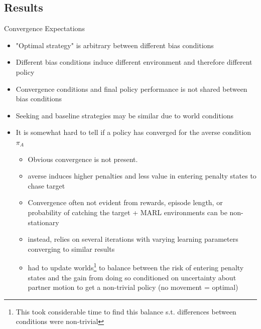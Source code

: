 \documentclass[aspectratio=1610, xcolor=dvipsnames]{packages/beamer}
\begin{document}
\subsection{Results}
\begin{frame}{Convergence Expectations}
    \begin{itemize}
        \item "Optimal strategy" is arbitrary between different bias conditions
        \item Different bias conditions induce different environment and therefore different policy
        \item Convergence conditions and final policy performance is not shared between bias conditions
        \item Seeking and baseline strategies may be similar due to world conditions
        \item It is somewhat hard to tell if a policy has converged for the averse condition $\pi_A$
        \begin{itemize}
            \item Obvious convergence is not present.
            \item averse induces higher penalties and less value in entering penalty states to chase target
            \item Convergence often not evident from rewards, episode length, or probability of catching the target + MARL environments can be non-stationary
            \item instead, relies on several iterations with varying learning parameters converging to similar results
            \item had to update worlds\footnote{This took considerable time to find this balance s.t. differences between conditions were non-trivial} to balance between the risk of entering penalty states and the gain from doing so conditioned on uncertainty about partner motion to get a non-trivial policy (no movement = optimal)
        \end{itemize}

    \end{itemize}
\end{frame}


\newcommand{\Wfig}{0.48}
\end{document}
